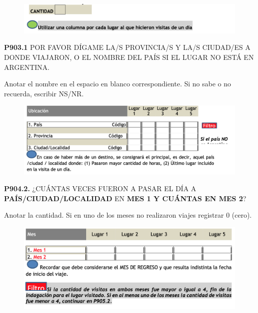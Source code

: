 \documentclass[
  openany]{book}
\begin{document}
\begin{figure}

{\centering \includegraphics[width=1\linewidth]{imagenes/figura6-283} 

}

\end{figure}

\textbf{P903.1} POR FAVOR DÍGAME LA/S PROVINCIA/S Y LA/S CIUDAD/ES A DONDE VIAJARON, O EL NOMBRE DEL PAÍS SI EL LUGAR NO ESTÁ EN ARGENTINA.

Anotar el nombre en el espacio en blanco correspondiente. Si no sabe o no recuerda, escribir NS/NR.

\begin{figure}

{\centering \includegraphics[width=1\linewidth]{imagenes/figura6-284} 

}

\end{figure}

\textbf{P904.2.} ¿CUÁNTAS VECES FUERON A PASAR EL DÍA A \textbf{PAÍS/CIUDAD/LOCALIDAD} EN \textbf{MES 1 Y CUÁNTAS EN MES 2}?

Anotar la cantidad. Si en uno de los meses no realizaron viajes registrar 0 (cero).

\begin{figure}

{\centering \includegraphics[width=1\linewidth]{imagenes/figura6-285} 

}

\end{figure}
\end{document}
